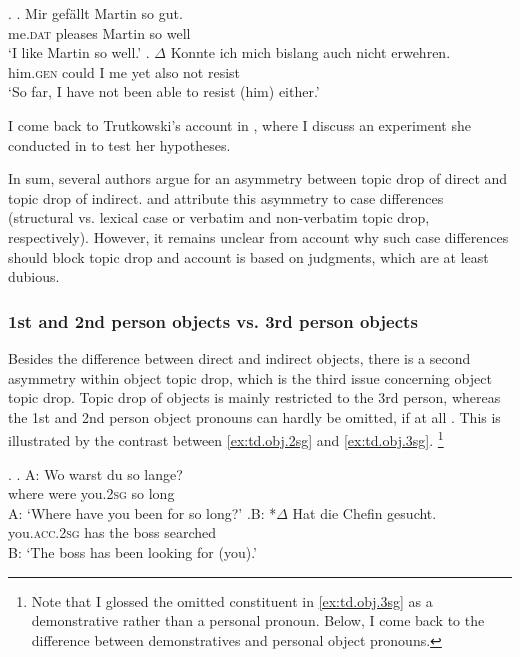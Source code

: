 \ex.\label{ex:gen.stimulus}
\ag. Mir gefällt Martin so gut. \\
me.\textsc{dat} pleases Martin so well \\
`I like Martin so well.'
\bg. $\Delta$ Konnte ich mich bislang auch nicht erwehren.\\
him.\textsc{gen} could I me yet also not resist\\
`So far, I have not been able to resist (him) either.' \citep[46, her judgment]{trutkowski2016}

I come back to Trutkowski's account in , where I discuss an experiment she conducted in \citet{trutkowski2018} to test her hypotheses.

In sum, several authors argue for an asymmetry between topic drop of direct and topic drop of indirect.
\citet{sternefeld1985} and \citet{trutkowski2016} attribute this asymmetry to case differences (structural vs. lexical case  or verbatim and non-verbatim topic drop, respectively).
However, it remains unclear from  account why such case differences should block topic drop and  account is based on judgments, which are at least dubious.

\subsubsection{1st and 2nd person objects vs. 3rd person objects}
Besides the difference between direct and indirect objects, there is a second asymmetry within object topic drop, which is the third issue concerning object topic drop.
Topic drop of objects is mainly restricted to the 3rd person, whereas the 1st and 2nd person object pronouns can hardly be omitted, if at all \citep{fries1988, auer1993, jaensch2005, erteschik-shir2007, volodina.onea2012, duden2016, duden2022, trutkowski2016}.
This is illustrated by the contrast between \ref{ex:td.obj.2sg} and \ref{ex:td.obj.3sg}.%
\footnote{Note that I glossed the omitted constituent in \ref{ex:td.obj.3sg} as a demonstrative rather than a personal pronoun.
Below, I come back to the difference between demonstratives and personal object pronouns.}

\ex.\label{ex:td.obj.2sg}
\ag. A: Wo warst du so lange?\\
{} where were you.\textsc{2sg} so long\\
A: `Where have you been for so long?'
\bg.B: *$\Delta$ Hat die Chefin gesucht.\\
{} \phantom{*}you.\textsc{acc.2sg} has the boss searched\\
B: `The boss has been looking for (you).' \citep[§1378, adapted]{duden2016}

